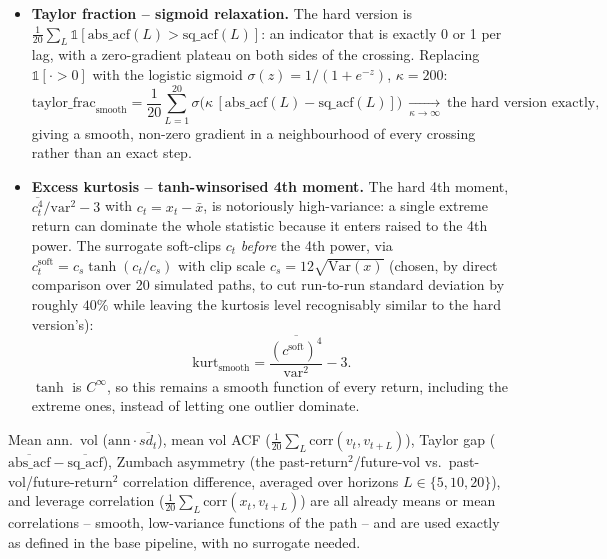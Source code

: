 \documentclass[11pt]{article}
\begin{document}
\begin{itemize}
\item \textbf{Taylor fraction -- sigmoid relaxation.} The hard version is
$\tfrac1{20}\sum_L\mathbb{1}[\text{abs\_acf}(L)>\text{sq\_acf}(L)]$: an indicator that
is exactly 0 or 1 per lag, with a zero-gradient plateau on both sides of the crossing.
Replacing $\mathbb{1}[\cdot>0]$ with the logistic sigmoid $\sigma(z)=1/(1+e^{-z})$,
$\kappa=200$:
\[
\text{taylor\_frac}_{\text{smooth}} = \frac{1}{20}\sum_{L=1}^{20}
\sigma\!\big(\kappa\,[\text{abs\_acf}(L)-\text{sq\_acf}(L)]\big)
\ \xrightarrow[\kappa\to\infty]{}\ \text{the hard version exactly},
\]
giving a smooth, non-zero gradient in a neighbourhood of every crossing rather than an
exact step.
\item \textbf{Excess kurtosis -- tanh-winsorised 4th moment.} The hard 4th moment,
$\overline{c_t^4}/\text{var}^2-3$ with $c_t=x_t-\bar x$, is notoriously
high-variance: a single extreme return can dominate the whole statistic because it
enters raised to the 4th power. The surrogate soft-clips $c_t$ \emph{before} the 4th
power, via $c_t^{\text{soft}}=c_s\tanh(c_t/c_s)$ with clip scale
$c_s=12\sqrt{\text{Var}(x)}$ (chosen, by direct comparison over 20 simulated paths, to
cut run-to-run standard deviation by roughly $40\%$ while leaving the kurtosis level
recognisably similar to the hard version's):
\[
\text{kurt}_{\text{smooth}} = \frac{\overline{(c^{\text{soft}})^4}}{\text{var}^2} - 3.
\]
$\tanh$ is $C^\infty$, so this remains a smooth function of every return, including the
extreme ones, instead of letting one outlier dominate.
\end{itemize}

Mean ann.\ vol ($\text{ann}\cdot\overline{sd_t}$), mean vol ACF
($\tfrac1{20}\sum_L\text{corr}(v_t,v_{t+L})$), Taylor gap
($\overline{\text{abs\_acf}}-\overline{\text{sq\_acf}}$), Zumbach asymmetry (the
past-return$^2$/future-vol vs.\ past-vol/future-return$^2$ correlation difference,
averaged over horizons $L\in\{5,10,20\}$), and leverage correlation
($\tfrac1{20}\sum_L\text{corr}(x_t,v_{t+L})$) are all already means or mean
correlations -- smooth, low-variance functions of the path -- and are used exactly as
defined in the base pipeline, with no surrogate needed.
\end{document}
